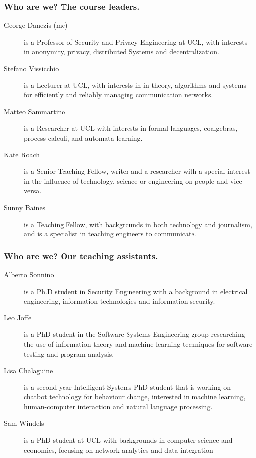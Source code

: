 \documentclass{beamer} %
\begin{document}
\begin{frame}
\frametitle{Who are we? The course leaders.} 

\begin{description}
\item[George Danezis (me)] is a Professor of Security and Privacy Engineering at UCL, with interests in anonymity, privacy, distributed Systems and decentralization.
\item[Stefano Vissicchio] is a Lecturer at UCL, with interests in in theory, algorithms and systems for efficiently and reliably managing communication networks.
\item[Matteo Sammartino] is a Researcher at UCL with interests in formal languages, coalgebras, process calculi, and automata learning.
\item[Kate Roach] is a Senior Teaching Fellow, writer and a researcher with a special interest in the influence of technology, science or engineering on people and vice versa.
\item[Sunny Baines] is a Teaching Fellow, with backgrounds in both technology and journalism, and is a specialist in teaching engineers to communicate.
\end{description}

\end{frame}

\begin{frame}
\frametitle{Who are we? Our teaching assistants.} 

\begin{description}
\item[Alberto Sonnino] is a Ph.D student in Security Engineering with a background in electrical engineering, information technologies and information security.
\item[Leo Joffe] is a PhD student in the Software Systems Engineering group researching the use of information theory and machine learning techniques for software testing and program analysis.
\item[Lisa Chalaguine] is a second-year Intelligent Systems PhD student that is working on chatbot technology for behaviour change, interested in machine learning, human-computer interaction and natural language processing. 
\item[Sam Windels] is a PhD student at UCL with backgrounds in computer science and economics, focusing on network analytics and data integration 
\end{description}

\end{frame}
\end{document}
